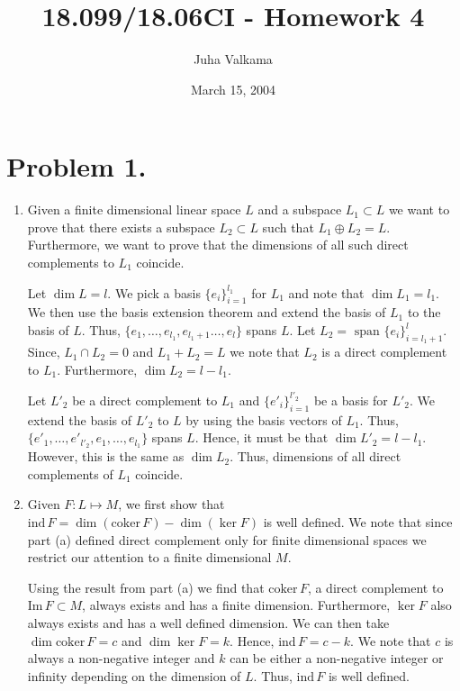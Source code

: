 \documentclass[11pt]{amsart}
\newcommand{\coker}{\textrm{coker}\,}
\newcommand{\Image}{\textrm{Im}\,}
\newcommand{\ind}{\textrm{ind}\,}
\begin{document}
\title{18.099/18.06CI - Homework 4}
\author{Juha Valkama}
\date{March 15, 2004}
\maketitle

\section*{Problem 1.}
\begin{enumerate}
\item Given a finite dimensional linear space $L$ and a subspace $L_1
  \subset L$ we want to prove that there exists a subspace $L_2
  \subset L$ such that $L_1\oplus L_2 =L$. Furthermore, we want to prove
  that the dimensions of all such direct complements to $L_1$ coincide.
  
  Let $\dim L=l$. We pick a basis $\{e_i\}_{i=1}^{l_1}$ for $L_1$ and
  note that $\dim L_1=l_1$. We then use the basis extension theorem
  and extend the basis of $L_1$ to the basis of $L$. Thus,
  $\{e_1,\ldots,e_{l_1},e_{l_1+1}\ldots,e_l\}$ spans $L$. Let
  $L_2=\textrm{ span } \{e_i\}_{i=l_1+1}^l$. Since, $L_1 \cap L_2=0$
  and $L_1 + L_2 = L$ we note that $L_2$ is a direct complement to
  $L_1$. Furthermore, $\dim L_2=l-l_1$.
  
  Let $L'_2$ be a direct complement to $L_1$ and
  $\{e'_{i}\}_{i=1}^{l'_2}$ be a basis for $L'_2$. We extend the basis
  of $L'_2$ to $L$ by using the basis vectors of $L_1$. Thus,
  $\{e'_1,\ldots,e'_{l'_2}, e_{1}, \ldots,e_{l_1}\}$ spans $L$. Hence,
  it must be that $\dim L'_2=l-l_1$.  However, this is the same as
  $\dim L_2$. Thus, dimensions of all direct complements of $L_1$ coincide.
\item Given $F: L \mapsto M$, we first show that $\ind F = \dim(\coker
  F)-\dim(\ker F)$ is well defined. We note that since part (a) defined
  direct complement only for finite dimensional spaces we
  restrict our attention to a finite dimensional $M$.
  
  Using the result from part (a) we find that $\coker F$, a direct
  complement to $\Image F \subset M$, always exists and has a finite
  dimension. Furthermore, $\ker F$ also always exists and has a well
  defined dimension. We can then take $\dim \coker F = c$ and $\dim
  \ker F = k$.  Hence, $\ind F=c-k$. We note that $c$ is always a
  non-negative integer and $k$ can be either a non-negative integer or
  infinity depending on the dimension of $L$.  Thus, $\ind F$ is well
  defined.
  

\end{enumerate}
\end{document}
